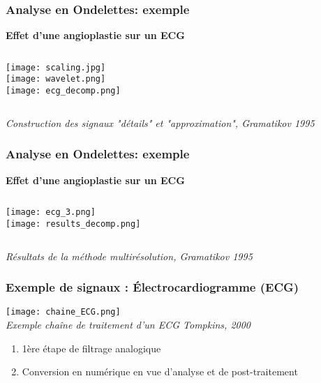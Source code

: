 \documentclass{beamer}
\begin{document}
\begin{frame}
\frametitle{Analyse en Ondelettes: exemple}
\textbf{Effet d'une angioplastie sur un ECG}\\
\vspace{0.3cm}
\begin{columns}
\column{60mm}
\texttt{[image: scaling.jpg]}\\
\texttt{[image: wavelet.png]}\\

\column{60mm}
\texttt{[image: ecg\_decomp.png]}

\end{columns}
\textit{\footnotesize Construction des signaux "détails" et "approximation", Gramatikov 1995 }
\end{frame}

\begin{frame}
\frametitle{Analyse en Ondelettes: exemple}
\textbf{Effet d'une angioplastie sur un ECG}\\
\vspace{0.3cm}
\begin{columns}
\column{60mm}
\texttt{[image: ecg\_3.png]}\\


\column{60mm}
\texttt{[image: results\_decomp.png]}\\

\end{columns}
\textit{\footnotesize Résultats de la méthode multirésolution, Gramatikov 1995 }\\
\vspace{0.3cm}
\end{frame}

\begin{frame}
\frametitle{Exemple de signaux : \'Electrocardiogramme (ECG)}
\begin{center}
\texttt{[image: chaine\_ECG.png]}\\
\textit{\footnotesize Exemple chaîne de traitement d'un ECG Tompkins, 2000}
\end{center}
\begin{enumerate}
\item 1ère étape de filtrage analogique
\item Conversion en numérique en vue d'analyse et de post-traitement
\end{enumerate}
\end{frame}
\end{document}
